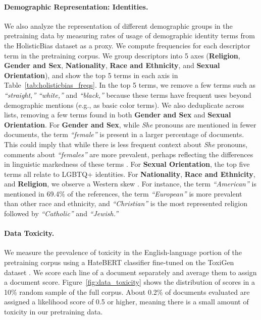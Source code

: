 \paragraph{Demographic Representation: Identities.} We also analyze the representation of different demographic groups in the pretraining data by measuring rates of usage of demographic identity terms from the HolisticBias dataset \citep{smith2022m} as a proxy. We compute frequencies for each descriptor term in the pretraining corpus. We group descriptors into 5 axes (\textbf{Religion}, \textbf{Gender and Sex}, \textbf{Nationality}, \textbf{Race and Ethnicity}, and \textbf{Sexual Orientation}), and show the top 5 terms in each axis in Table~\ref{tab:holisticbias_freqs}. In the top 5 terms, we remove a few terms such as \textit{``straight,''} \textit{``white,''} and \textit{``black,''} because these terms have frequent uses beyond demographic mentions (e.g., as basic color terms). We also deduplicate across lists, removing a few terms found in both \textbf{Gender and Sex} and \textbf{Sexual Orientation}. For \textbf{Gender and Sex}, while \textit{She} pronouns are mentioned in fewer documents, the term \textit{``female''} is present in a larger percentage of documents. This could imply that while there is less frequent context about \textit{She} pronouns, comments about \textit{``females''} are more prevalent, perhaps reflecting the differences in linguistic markedness of these terms \citep{blodgett2021stereotyping}. For \textbf{Sexual Orientation}, the top five terms all relate to LGBTQ+ identities. For \textbf{Nationality}, \textbf{Race and Ethnicity}, and \textbf{Religion}, we observe a Western skew \citep{bhatt2022recontextualizing}. For instance, the term \textit{``American''} is mentioned in 69.4\% of the references, the term  \textit{``European''} is more prevalent than other race and ethnicity, and \textit{``Christian''} is the most represented religion followed by \textit{``Catholic''} and \textit{``Jewish.''} 

\paragraph{Data Toxicity.} We measure the prevalence of toxicity in the English-language portion of the pretraining corpus using a HateBERT classifier fine-tuned on the ToxiGen dataset \citep{hartvigsen2022toxigen}. We score each line of a document separately and average them to assign a document score. Figure~\ref{fig:data_toxicity} shows the distribution of scores in a 10\% random sample of the full corpus. About 0.2\% of documents evaluated are assigned a likelihood score of 0.5 or higher, meaning there is a small amount of toxicity in our pretraining data. 


